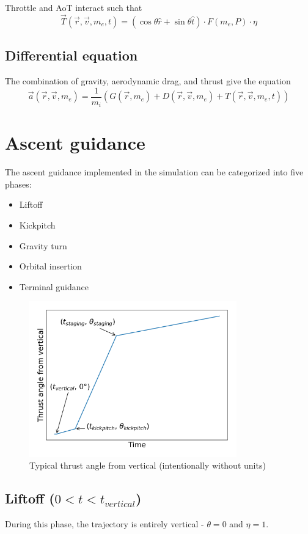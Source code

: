 \documentclass[11pt]{article}
\begin{document}
Throttle and AoT interact such that 
$$
\vec{T}(\vec{r}, \vec{v}, m_e, t) = \left( \cos \theta \hat{r} + \sin \theta \hat{t} \right) \cdot F(m_e, P) \cdot \eta
$$

\subsection{Differential equation}
The combination of gravity, aerodynamic drag, and thrust give the equation
$$
\vec{a}(\vec{r}, \vec{v}, m_e) = \frac{1}{m_i} \left( G(\vec{r}, m_e) + D(\vec{r}, \vec{v}, m_e) + T(\vec{r}, \vec{v}, m_e, t) \right)
$$

\section{Ascent guidance}
The ascent guidance implemented in the simulation can be categorized into five phases:
\begin{itemize}
  \item Liftoff
  \item Kickpitch
  \item Gravity turn
  \item Orbital insertion
  \item Terminal guidance
\end{itemize}

\begin{figure}[H]
  \centering
  \includegraphics[width=0.8\textwidth]{./plots/angleFromVertical.png}
  \caption{Typical thrust angle from vertical (intentionally without units)}
\end{figure}

\subsection{Liftoff ($0 < t < t_{vertical}$)}
During this phase, the trajectory is entirely vertical - $\theta = 0$ and $\eta = 1$.
\end{document}
